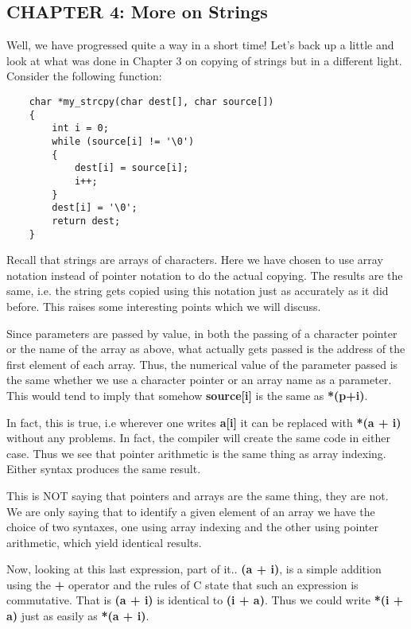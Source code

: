 \hypertarget{chapter-4-more-on-strings}{%
\subsection{CHAPTER 4: More on
Strings}\label{chapter-4-more-on-strings}}

Well, we have progressed quite a way in a short time! Let's back up a
little and look at what was done in Chapter 3 on copying of strings but
in a different light. Consider the following function:

\begin{verbatim}
    char *my_strcpy(char dest[], char source[])
    {
        int i = 0;
        while (source[i] != '\0')
        {
            dest[i] = source[i];
            i++;
        }
        dest[i] = '\0';
        return dest;
    }
\end{verbatim}

Recall that strings are arrays of characters. Here we have chosen to use
array notation instead of pointer notation to do the actual copying. The
results are the same, i.e. the string gets copied using this notation
just as accurately as it did before. This raises some interesting points
which we will discuss.

Since parameters are passed by value, in both the passing of a character
pointer or the name of the array as above, what actually gets passed is
the address of the first element of each array. Thus, the numerical
value of the parameter passed is the same whether we use a character
pointer or an array name as a parameter. This would tend to imply that
somehow \textbf{source{[}i{]}} is the same as \textbf{*(p+i)}.

In fact, this is true, i.e wherever one writes \textbf{a{[}i{]}} it can
be replaced with \textbf{*(a + i)} without any problems. In fact, the
compiler will create the same code in either case. Thus we see that
pointer arithmetic is the same thing as array indexing. Either syntax
produces the same result.

This is NOT saying that pointers and arrays are the same thing, they are
not. We are only saying that to identify a given element of an array we
have the choice of two syntaxes, one using array indexing and the other
using pointer arithmetic, which yield identical results.

Now, looking at this last expression, part of it.. \textbf{(a + i)}, is
a simple addition using the \textbf{+} operator and the rules of C state
that such an expression is commutative. That is \textbf{(a + i)} is
identical to \textbf{(i + a)}. Thus we could write \textbf{*(i + a)}
just as easily as \textbf{*(a + i)}.

